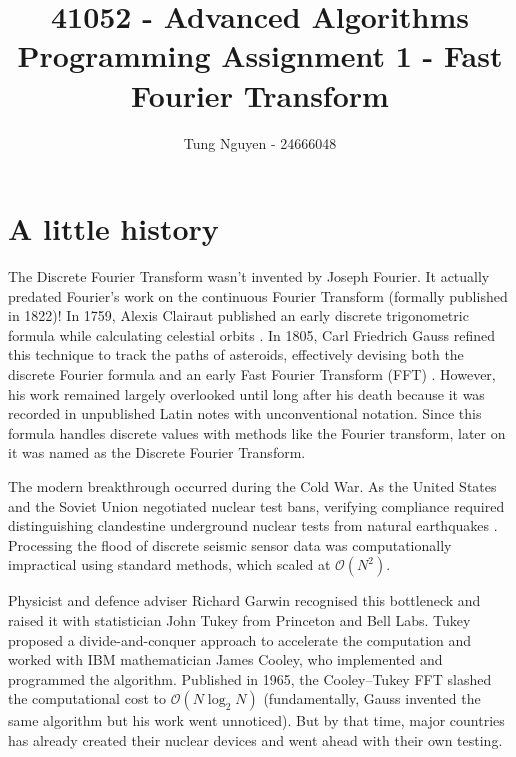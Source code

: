 \documentclass{article}
\title{41052 - Advanced Algorithms \\ {\Large Programming Assignment 1 - Fast Fourier Transform}}
\author{Tung Nguyen - 24666048}
\date{}
\begin{document}
\maketitle
\tableofcontents
\pagebreak

\section{A little history}

The Discrete Fourier Transform wasn't invented by Joseph Fourier.
It actually predated Fourier's work on the continuous Fourier Transform (formally published in 1822)! In 1759, Alexis Clairaut published an early discrete trigonometric formula while calculating celestial orbits \cite{Terras_1999}. In 1805, Carl Friedrich Gauss refined this technique to track the paths of asteroids, effectively devising both the discrete Fourier formula and an early Fast Fourier Transform (FFT) \cite{fbf62979-8f62-38b9-8163-f7084de8b15a}. However, his work remained largely overlooked until long after his death because it was recorded in unpublished Latin notes with unconventional notation. Since this formula handles discrete values with methods like the Fourier transform, later on it was named as the Discrete Fourier Transform.

The modern breakthrough occurred during the Cold War. As the United States and the Soviet Union negotiated nuclear test bans, verifying compliance required distinguishing clandestine underground nuclear tests from natural earthquakes \cite{fbf62979-8f62-38b9-8163-f7084de8b15a}. Processing the flood of discrete seismic sensor data was computationally impractical using standard methods, which scaled at $\mathcal{O}(N^2)$.

Physicist and defence adviser Richard Garwin recognised this bottleneck and raised it with statistician John Tukey from Princeton and Bell Labs. Tukey proposed a divide-and-conquer approach to accelerate the computation and worked with IBM mathematician James Cooley, who implemented and programmed the algorithm. Published in 1965, the Cooley–Tukey FFT slashed the computational cost to $\mathcal{O}(N \log_2 N)$ \cite{d3ea2d52-5ab2-3128-8b80-efb85267295d} (fundamentally, Gauss invented the same algorithm but his work went unnoticed). But by that time, major countries has already created their nuclear devices and went ahead with their own testing.
\end{document}
